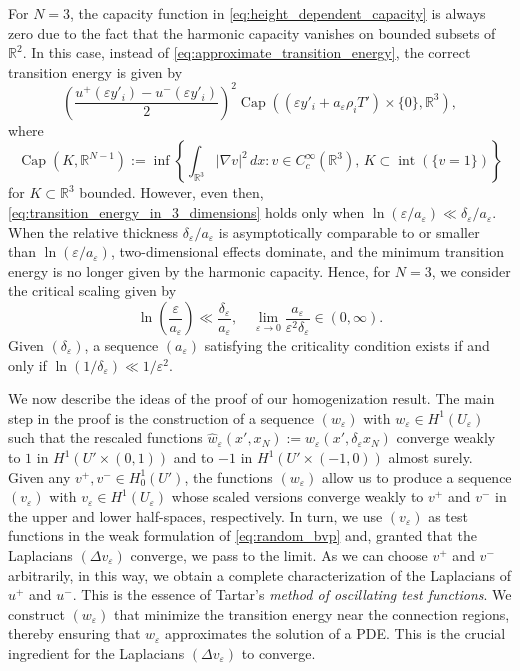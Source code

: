 \documentclass{article}
\numberwithin{equation}{section}
\theoremstyle{definition}
\theoremstyle{remark}
\newcommand{\cpct}{\operatorname{Cap}}
\newcommand{\topint}{\operatorname{int}}
\begin{document}
For $N = 3$, the capacity function in \eqref{eq:height_dependent_capacity} is always zero due to the fact that the harmonic capacity vanishes on bounded subsets of $\mathbb{R}^2$. In this case, instead of \eqref{eq:approximate_transition_energy}, the correct transition energy is given by
\begin{equation} \label{eq:transition_energy_in_3_dimensions}
    \left(\frac{u^+(\varepsilon y'_i) - u^-(\varepsilon y'_i)}{2}\right)^2 \cpct((\varepsilon y'_i + a_\varepsilon \rho_i T') \times \{0\}, \mathbb{R}^3),
\end{equation}
where
\[
\cpct(K, \mathbb{R}^{N - 1}) := \inf \left\{\int_{\mathbb{R}^3} |\nabla v|^2 \, dx : v \in C_c^\infty(\mathbb{R}^3), \, K \subset \topint(\{v = 1\}) \right\}
\]
for $K \subset \mathbb{R}^3$ bounded. However, even then, \eqref{eq:transition_energy_in_3_dimensions} holds only when $\ln(\varepsilon/a_\varepsilon) \ll \delta_\varepsilon/a_\varepsilon$. When the relative thickness $\delta_\varepsilon/a_\varepsilon$ is asymptotically comparable to or smaller than $\ln(\varepsilon/a_\varepsilon)$, two-dimensional effects dominate, and the minimum transition energy is no longer given by the harmonic capacity. Hence, for $N = 3$, we consider the critical scaling given by
\[
\ln\left(\frac{\varepsilon}{a_\varepsilon}\right) \ll \frac{\delta_\varepsilon}{a_\varepsilon}, \quad \lim_{\varepsilon \to 0} \frac{a_\varepsilon}{\varepsilon^2 \delta_\varepsilon} \in (0, \infty).
\]
Given $(\delta_\varepsilon)$, a sequence $(a_\varepsilon)$ satisfying the criticality condition exists if and only if $\ln(1/\delta_\varepsilon) \ll 1/\varepsilon^2$.

We now describe the ideas of the proof of our homogenization result. The main step in the proof is the construction of a sequence $(w_\varepsilon)$ with $w_\varepsilon \in H^1(U_\varepsilon)$ such that the rescaled functions $\hat{w}_\varepsilon(x', x_N) := w_\varepsilon(x', \delta_\varepsilon x_N)$ converge weakly to $1$ in $H^1(U' \times (0, 1))$ and to $-1$ in $H^1(U' \times (-1, 0))$ almost surely. Given any $v^+, v^- \in H_0^1(U')$, the functions $(w_\varepsilon)$ allow us to produce a sequence $(v_\varepsilon)$ with $v_\varepsilon \in H^1(U_\varepsilon)$ whose scaled versions converge weakly to $v^+$ and $v^-$ in the upper and lower half-spaces, respectively. In turn, we use $(v_\varepsilon)$ as test functions in the weak formulation of \eqref{eq:random_bvp} and, granted that the Laplacians $(\Delta v_\varepsilon)$ converge, we pass to the limit. As we can choose $v^+$ and $v^-$ arbitrarily, in this way, we obtain a complete characterization of the Laplacians of $u^+$ and $u^-$. This is the essence of Tartar's \textit{method of oscillating test functions}. We construct $(w_\varepsilon)$ that minimize the transition energy near the connection regions, thereby ensuring that $w_\varepsilon$ approximates the solution of a PDE. This is the crucial ingredient for the Laplacians $(\Delta v_\varepsilon)$ to converge.
\end{document}
